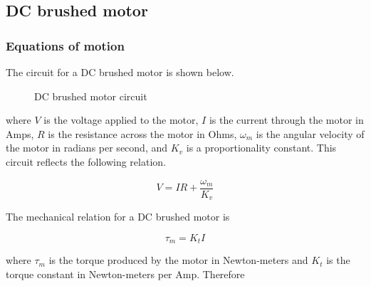 \subsection{DC brushed motor}

\subsubsection{Equations of motion}

The circuit for a DC brushed motor is shown below.

\begin{figure}[H]
  \centering


  \caption{DC brushed motor circuit}
  \label{fig:dc_motor_circuit}
\end{figure}

where $V$ is the voltage applied to the motor, $I$ is the current through the
motor in Amps, $R$ is the resistance across the motor in Ohms, $\omega_m$ is the
angular velocity of the motor in radians per second, and $K_v$ is a
proportionality constant. This circuit reflects the following relation.

\begin{equation}
  V = IR + \frac{\omega_m}{K_v} \label{eq:motor_V}
\end{equation}

The mechanical relation for a DC brushed motor is

\begin{equation}
  \tau_m = K_t I \label{eq:motor_tau_m}
\end{equation}

where $\tau_m$ is the torque produced by the motor in Newton-meters and $K_t$ is
the torque constant in Newton-meters per Amp. Therefore

